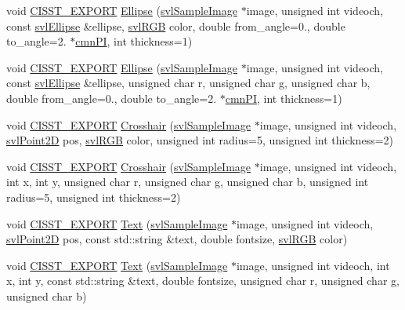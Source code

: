 \begin{DoxyCompactItemize}
\item 
void \hyperlink{cmn_export_macros_8h_a99393e0c3ac434b2605235bbe20684f8}{C\+I\+S\+S\+T\+\_\+\+E\+X\+P\+O\+R\+T} \hyperlink{namespacesvl_draw_a84f749381c20f93a16c05870dc8f59f3}{Ellipse} (\hyperlink{classsvl_sample_image}{svl\+Sample\+Image} $\ast$image, unsigned int videoch, const \hyperlink{structsvl_ellipse}{svl\+Ellipse} \&ellipse, \hyperlink{structsvl_r_g_b}{svl\+R\+G\+B} color, double from\+\_\+angle=0., double to\+\_\+angle=2. $\ast$\hyperlink{cmn_constants_8h_aceb5aee49c7545745836d307b9b671ec}{cmn\+P\+I}, int thickness=1)
\item 
void \hyperlink{cmn_export_macros_8h_a99393e0c3ac434b2605235bbe20684f8}{C\+I\+S\+S\+T\+\_\+\+E\+X\+P\+O\+R\+T} \hyperlink{namespacesvl_draw_a51d362f4450514dbbf8ad2d41fef6c4a}{Ellipse} (\hyperlink{classsvl_sample_image}{svl\+Sample\+Image} $\ast$image, unsigned int videoch, const \hyperlink{structsvl_ellipse}{svl\+Ellipse} \&ellipse, unsigned char r, unsigned char g, unsigned char b, double from\+\_\+angle=0., double to\+\_\+angle=2. $\ast$\hyperlink{cmn_constants_8h_aceb5aee49c7545745836d307b9b671ec}{cmn\+P\+I}, int thickness=1)
\item 
void \hyperlink{cmn_export_macros_8h_a99393e0c3ac434b2605235bbe20684f8}{C\+I\+S\+S\+T\+\_\+\+E\+X\+P\+O\+R\+T} \hyperlink{namespacesvl_draw_a1c674a4f1d623089f5ecdd08f12e2e17}{Crosshair} (\hyperlink{classsvl_sample_image}{svl\+Sample\+Image} $\ast$image, unsigned int videoch, \hyperlink{structsvl_point2_d}{svl\+Point2\+D} pos, \hyperlink{structsvl_r_g_b}{svl\+R\+G\+B} color, unsigned int radius=5, unsigned int thickness=2)
\item 
void \hyperlink{cmn_export_macros_8h_a99393e0c3ac434b2605235bbe20684f8}{C\+I\+S\+S\+T\+\_\+\+E\+X\+P\+O\+R\+T} \hyperlink{namespacesvl_draw_a29c9b57fd19395200fbb152ea5758147}{Crosshair} (\hyperlink{classsvl_sample_image}{svl\+Sample\+Image} $\ast$image, unsigned int videoch, int x, int y, unsigned char r, unsigned char g, unsigned char b, unsigned int radius=5, unsigned int thickness=2)
\item 
void \hyperlink{cmn_export_macros_8h_a99393e0c3ac434b2605235bbe20684f8}{C\+I\+S\+S\+T\+\_\+\+E\+X\+P\+O\+R\+T} \hyperlink{namespacesvl_draw_a9be269ab4f2430080692ef0f3424fe17}{Text} (\hyperlink{classsvl_sample_image}{svl\+Sample\+Image} $\ast$image, unsigned int videoch, \hyperlink{structsvl_point2_d}{svl\+Point2\+D} pos, const std\+::string \&text, double fontsize, \hyperlink{structsvl_r_g_b}{svl\+R\+G\+B} color)
\item 
void \hyperlink{cmn_export_macros_8h_a99393e0c3ac434b2605235bbe20684f8}{C\+I\+S\+S\+T\+\_\+\+E\+X\+P\+O\+R\+T} \hyperlink{namespacesvl_draw_a6c7a6c4a6ebae53fa327000c995a6ed5}{Text} (\hyperlink{classsvl_sample_image}{svl\+Sample\+Image} $\ast$image, unsigned int videoch, int x, int y, const std\+::string \&text, double fontsize, unsigned char r, unsigned char g, unsigned char b)

\end{DoxyCompactItemize}
